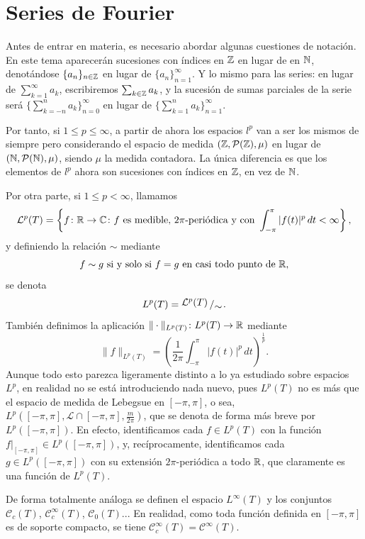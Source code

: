 \documentclass[a4paper, 11pt, oneside]{report}
\begin{document}
\chapter{Series de Fourier}

Antes de entrar en materia, es necesario abordar algunas cuestiones de notación. En este tema aparecerán sucesiones con índices en $\mathbb Z$ en lugar de en $\mathbb N$, denotándose $\{a_n\}_{n \in \mathbb Z}$ en lugar de $\{a_n\}_{n=1}^\infty$. Y lo mismo para las series: en lugar de $\sum_{k=1}^\infty a_k$, escribiremos $\sum_{k \in \mathbb Z}a_k$, y la sucesión de sumas parciales de la serie será $\{\sum_{k=-n}^n a_k\}_{n=0}^\infty$ en lugar de $\{\sum_{k=1}^n a_k\}_{n=1}^\infty$.

Por tanto, si $1 \leq p \leq \infty$, a partir de ahora los espacios $l^p$ van a ser los mismos de siempre pero considerando el espacio de medida $(\mathbb Z,\mathcal{P}(\mathbb Z), \mu)$ en lugar de $(\mathbb N,\mathcal{P}(\mathbb N),\mu)$, siendo $\mu$ la medida contadora. La única diferencia es que los elementos de $l^p$ ahora son sucesiones con índices en $\mathbb Z$, en vez de $\mathbb N$.

Por otra parte, si $1 \leq p < \infty$, llamamos
\[\mathcal{L}^p(T) = \left\{f \colon \mathbb R \to \mathbb C \colon f \textup{ es medible, } 2\pi \textup{-periódica y con } \int_{-\pi}^\pi |f(t)|^p \, dt < \infty\right\},\]
y definiendo la relación $\sim$ mediante
\[f \sim g \textup{ si y solo si } f=g \textup{ en casi todo punto de } \mathbb R,\]
se denota
\[L^p(T) = \bigslant{\mathcal{L}^p(T)}{\sim}.\]
También definimos la aplicación $\|\cdot\|_{L^p(T)} \colon L^p(T) \to \mathbb R$ mediante
\[\|f\|_{L^p(T)} = \left(\frac{1}{2\pi}\int_{-\pi}^\pi |f(t)|^p \, dt\right)^{\frac{1}{p}}.\]
Aunque todo esto parezca ligeramente distinto a lo ya estudiado sobre espacios $L^p$, en realidad no se está introduciendo nada nuevo, pues $L^p(T)$ no es más que el espacio de medida de Lebegsue en $[-\pi,\pi]$, o sea, $L^p([-\pi, \pi], \mathcal{L} \cap [-\pi,\pi],\frac{m}{2\pi})$, que se denota de forma más breve por $L^p([-\pi,\pi])$. En efecto, identificamos cada $f \in L^p(T)$ con la función $f |_{[-\pi,\pi]} \in L^p([-\pi, \pi])$, y, recíprocamente, identificamos cada $g \in L^p([-\pi,\pi])$ con su extensión $2\pi$-periódica a todo $\mathbb R$, que claramente es una función de $L^p(T)$.

De forma totalmente análoga se definen el espacio $L^\infty(T)$ y los conjuntos $\mathcal{C}_c(T)$, $\mathcal{C}^\infty_c(T)$, $\mathcal{C}_0(T)$... En realidad, como toda función definida en $[-\pi,\pi]$ es de soporte compacto, se tiene $\mathcal{C}^\infty_c(T) = \mathcal{C}^\infty(T)$.
\end{document}
